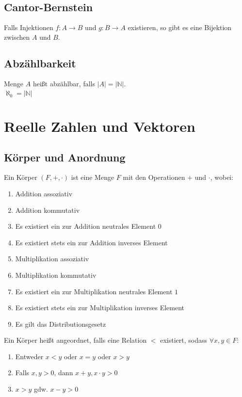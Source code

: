 \documentclass[halfparscip]{scrartcl}
\newcounter{subsection2}
\begin{document}
\subsection{Cantor-Bernstein}
Falls Injektionen $f: A \rightarrow B$ und $g: B \rightarrow A$ existieren, so gibt es eine Bijektion zwischen $A$ und $B$.

\subsection{Abzählbarkeit}
Menge $A$ heißt abzählbar, falls $\vert A \vert = \vert \mathbb{N} \vert$.\\
$\aleph_0 = \vert \mathbb{N}\vert$

\newpage
\section{Reelle Zahlen und Vektoren}
\subsection{Körper und Anordnung}
Ein Körper $(F,+,\cdot)$ ist eine Menge $F$ mit den Operationen $+$ und $\cdot$, wobei:
\begin{enumerate}
	\item Addition assoziativ
	\item Addition kommutativ
	\item Es existiert ein zur Addition neutrales Element $0$
	\item Es existiert stets ein zur Addition inverses Element
	\item Multiplikation assoziativ
	\item Multiplikation kommutativ
	\item Es existiert ein zur Multiplikation neutrales Element $1$
	\item Es existiert stets ein zur Multiplikation inverses Element
	\item Es gilt das Distributionsgesetz
\end{enumerate}
%
Ein Körper heißt angeordnet, falls eine Relation $<$ existiert, sodass $\forall x, y \in F$:
\begin{enumerate}
	\item Entweder $x < y$ oder $x = y$ oder $x > y$
	\item Falls $x, y > 0$, dann $x + y, x \cdot y > 0$
	\item $x > y$ gdw. $x - y > 0$
\end{enumerate}
\end{document}
